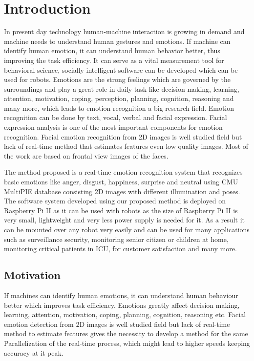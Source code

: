 \chapter{Introduction}

In present day technology human-machine interaction is growing in demand and machine needs to understand human gestures and emotions. If machine can identify human emotion, it can understand human behavior better, thus improving the task efficiency. It can serve as a vital measurement tool for behavioral science, socially intelligent software can be developed which can be used for robots. Emotions are the strong feelings which are governed by the surroundings and play a great role in daily task like decision making, learning, attention, motivation, coping, perception, planning, cognition, reasoning and many more, which leads to emotion recognition a big research field. Emotion recognition can be done by text, vocal, verbal and facial expression. Facial expression analysis is one of the most important components for emotion recognition. Facial emotion recognition from 2D images is well studied field but lack of real-time method that estimates features even low quality images. Most of the work are based on frontal view images of the faces.\par
The method proposed is a real-time emotion recognition system that recognizes basic emotions like anger, disgust, happiness, surprise and neutral using CMU MultiPIE database consisting 2D images with different illumination and poses. The software system developed using our proposed method is deployed on Raspberry Pi II as it can be used with robots as the size of Raspberry Pi II is very small, lightweight and very less power supply is needed for it. As a result it can be mounted over any robot very easily and can be used for many applications such as surveillance security, monitoring senior citizen or children at home, monitoring critical patients in ICU, for customer satisfaction and many more.

\section{Motivation}

If machines can identify human emotions, it can understand human behaviour better which   improves task efficiency. Emotions greatly affect decision making, learning, attention, motivation, coping, planning, cognition, reasoning etc. Facial emotion detection from 2D images is well studied field but lack of real-time method to estimate features gives the necessity to develop a method for the same Parallelization of the real-time process, which might lead to higher speeds keeping accuracy at it peak.